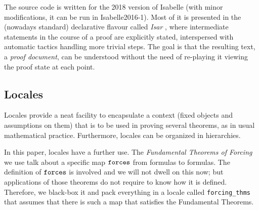 The source code is written for the 2018 version of Isabelle (with
minor modifications, it can be run in Isabelle2016-1). Most of it is
presented in the (nowadays standard) declarative flavour called
\emph{Isar} \cite{DBLP:conf/tphol/Wenzel99}, where intermediate
statements in the course of a proof are explicitly stated,
interspersed with automatic tactics handling more trivial steps. The
goal is that the resulting text, a \emph{proof document}, can be
understood without the need of re-playing it viewing the proof state
at each point.

\subsection{Locales}
\label{sec:locales}
Locales \cite{ballarin2010tutorial} provide a neat facility to
encapsulate a context (fixed objects and assumptions on them) that is
to be used in proving several theorems, as in usual mathematical
practice. Furthermore, locales can be organized in hierarchies. 

In this paper, locales have a further use. The \emph{Fundamental
  Theorems of Forcing} we use talk about a specific map $\mathop{\mathtt{forces}}$
from formulas to formulas. The definition of $\mathop{\mathtt{forces}}$ is involved
and we will not dwell on this now; but applications of those theorems
do not require to know how it is defined. Therefore, we black-box it
and pack everything in a locale called \texttt{forcing\_thms} that
assumes that there is such a 
map that satisfies the Fundamental Theorems.



